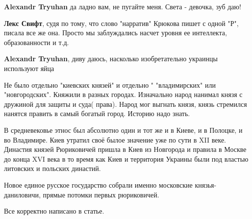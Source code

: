 \begin{itemize}
\begin{itemize}
\textbf{Alexandr Tryuhan} да ладно вам, не пугайте меня. Света - девочка, зуб даю! \Smiley[1.0][yellow]

 
\textbf{Лекс Свифт}, судя по тому, что слово "нарратив" Крюкова пишет с одной "Р", писала все же она. Просто мы заблуждались насчет уровня ее интеллекта, образованности и т.д.

 
\textbf{Alexandr Tryuhan}, диву даюсь, насколько изобретательно украинцы используют яйца
\end{itemize}

 
Не было отдельно "киевских князей" и отдельно " "владимирских" или
"новгородских". Княжили в разных городах. Изначально народ нанимал князя с
дружиной для защиты и суда( права). Народ мог выгнать князя, князь стремился
нанятся править в самый богатый город. Историю надо знать.


В средневековье этнос был абсолютно один и тот же и в Киеве, и в Полоцке, и во
Владимире. Киев утратил своё былое значение уже по сути в XII веке. Династия
князей Рюриковичей пришла в Киев из Новгорода и правила в Москве до конца XVI
века в то время как Киев и территория Украины были под властью литовских и
польских династий.

Новое единое русское государство собрали именно московские князья-даниловичи,
прямые потомки первых рюриковичей.

Все корректно написано в статье.

\end{itemize}


